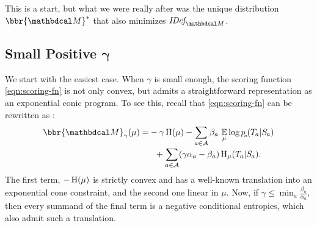 \documentclass[twoside]{article}
\begin{document}
This is a start, but what we were really after was the unique distribution
$\bbr{\dg M}^*$ that also minimizes $\IDef{\dg M}$.

\subsection{%
    Small Positive
    \texorpdfstring{$\boldsymbol\gamma$}{gamma}%
} \label{sec:small-gamma}

We start with the easiest case. When $\gamma$ is small enough, 
the scoring function \eqref{eqn:scoring-fn} is not only convex, 
but admits a straightforward representation as an exponential conic program.
To see this, recall that \eqref{eqn:scoring-fn}
 can be rewritten as \parencite[Proposition 4.6]{pdg-aaai}:
\begin{equation}
    \begin{aligned}
        \bbr{\dg M}_\gamma(\mu) = 
        &-\gamma\H(\mu) - 
            \sum_{a \in \Ar}
                \beta_a\, \Ex_\mu 
                    \log {p\ssub a(\Tgt a | \Src a)}
                \\[-0.5ex]
            &~~+ \sum_{a \in \Ar}
            (\gamma \alpha_a - \beta_a)
                \H_\mu (\Tgt a | \Src a).
    \end{aligned}
    \label{eq:altscore}
\end{equation}
The first term, $-\operatorname{\mathrm{H}}(\mu)$ is strictly convex and has a well-known 
translation into an exponential cone constraint, and the second one linear in $\mu$. 
Now, if $\gamma \le \min_{a} \frac{\beta_a}{\alpha_a}$, then every summand of the final term is a negative conditional entropies, which also admit such a translation.
\end{document}
